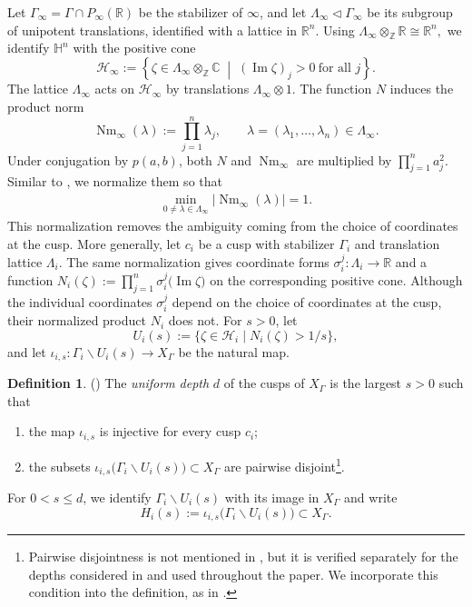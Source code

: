 \documentclass[12 pt]{amsart}
\theoremstyle{definition}
\newtheorem{definition}[theorem]{Definition}
\newcommand{\Hu}{\mathbb{H}}
\begin{document}
Let $\Gamma_\infty=\Gamma\cap P_\infty(\mathbb R)$ be the stabilizer of
$\infty$, and let $\Lambda_\infty\triangleleft\Gamma_\infty$ be its
subgroup of unipotent translations, identified with a lattice in
$\mathbb R^n.$ Using
\(
\Lambda_\infty\otimes_{\mathbb Z}\mathbb R\cong\mathbb R^n,
\)
we identify $\Hu^n$ with the positive cone
\[
\mathcal H_\infty
:=
\left\{
\zeta\in\Lambda_\infty\otimes_{\mathbb Z}\mathbb C
\;\middle|\;
(\operatorname{Im}\zeta)_j>0\ \text{for all }j
\right\}.
\]
The lattice $\Lambda_\infty$ acts on $\mathcal H_\infty$ by translations $\Lambda_\infty\otimes 1.$ 
The function $N$ induces the product norm
\[
\operatorname{Nm}_\infty(\lambda)
:=
\prod_{j=1}^n\lambda_j,
\qquad
\lambda=(\lambda_1,\ldots,\lambda_n)\in\Lambda_\infty.
\]
Under conjugation by $p(a,b)$, both $N$ and
$\operatorname{Nm}_\infty$ are multiplied by
$\prod_{j=1}^n a_j^2$. Similar to \cite[\S 1]{bakker2018geometric}, we normalize them so that
\begin{align}\label{lattice normalization}
\min_{0\neq\lambda\in\Lambda_\infty}
\left|\operatorname{Nm}_\infty(\lambda)\right|=1.
\end{align}
This normalization removes the ambiguity coming from the choice of
coordinates at the cusp. More generally, let $c_i$ be a cusp with stabilizer $\Gamma_i$ and
translation lattice $\Lambda_i$. The same normalization gives coordinate
forms
\(
\sigma_i^j:\Lambda_i\longrightarrow\mathbb R
\)
and a  function
\(
N_i(\zeta)
:=
\prod_{j=1}^n
\sigma_i^j\bigl(\operatorname{Im}\zeta\bigr)
\)
on the corresponding positive cone. Although the individual coordinates
$\sigma_i^j$ depend on the choice of coordinates at the cusp, their
normalized product $N_i$ does not. For $s>0$, let
\[U_i(s):=\{\zeta\in\mathcal H_i\mid N_i(\zeta)>1/s\},\] and let
\(\iota_{i,s}:\Gamma_i\backslash U_i(s)\to X_\Gamma\) be the natural map.

\begin{definition}(\cite[Def 1.1]{bakker2018geometric})
The \emph{uniform depth} $d$ of the cusps of $X_\Gamma$ is the largest
$s>0$ such that
\begin{enumerate}
    \item the map $\iota_{i,s}$ is injective for every cusp $c_i$;
    \item the subsets
    \(
    \iota_{i,s}\bigl(\Gamma_i\backslash U_i(s)\bigr)
    \subset X_\Gamma
    \)
    are pairwise disjoint\footnote{Pairwise disjointness is not mentioned in
\cite[Definition~1.1]{bakker2018geometric}, but it is verified separately
for the depths considered in \cite[\S 3]{bakker2018geometric} and used
throughout the paper. We incorporate this condition into the definition,
as in \cite[Definition~3.7]{bakker2018kodaira}.}.
\end{enumerate}
\end{definition}
 For $0<s\leq d$,
we identify $\Gamma_i\backslash U_i(s)$ with its image in $X_\Gamma$ and
write
\[
H_i(s):=\iota_{i,s}\bigl(\Gamma_i\backslash U_i(s)\bigr)\subset X_\Gamma.
\]
\end{document}
